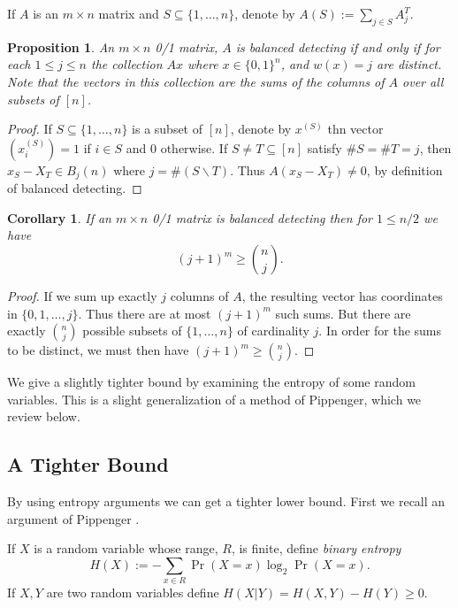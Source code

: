 \documentclass{article}
\newtheorem{proposition}{Proposition}
\newtheorem{corollary}{Corollary}
\begin{document}
If $A$ is an $m \times n$ matrix and $S \subseteq \{1, \dots, n\}$,
denote by $A(S) := \sum_{j \in S} A^T_j$.
\begin{proposition}
  An $m\times n$ 0/1 matrix, $A$ is balanced detecting if and only if
  for each $1 \le j \le n$ the
  collection $A x$ where $x\in \{0,1\}^n$, and $w(x) = j$ are
  distinct.  Note that the vectors in this collection are the sums of
  the columns of $A$ over all subsets of $[n]$.
\end{proposition}
\begin{proof}
  If $S \subseteq \{1, \dots, n\}$ is a subset of $[n]$, denote by
  $x^{(S)}$  thn vector $(x^{(S)}_i) = 1$ if $i \in S$ and 0
  otherwise.  If $S \ne T \subseteq [n]$ satisfy $\#S = \#T = j$, then
  $x_S - X_T \in B_j(n)$ where $j = \# (S \backslash T)$.  Thus
  $A(x_S - X_T) \ne 0$, by definition of balanced detecting.
\end{proof}
\begin{corollary}
  If an $m \times n$ 0/1 matrix is balanced detecting then for $1 \le
  n/2$ we have
  \begin{displaymath}
    (j+1)^m \ge \binom{n}{j}.
  \end{displaymath}
\end{corollary}
\begin{proof}
  If we sum up exactly $j$ columns of $A$, the resulting vector has
  coordinates in $\{0,1, \dots, j\}$.  Thus there are at most
  $(j+1)^m$ such sums.  But there are exactly $\binom{n}{j}$ possible
  subsets of $\{1, \dots, n\}$ of cardinality $j$.  In order for the
  sums to be distinct, we must then have $(j+1)^m \ge \binom{n}{j}$.
\end{proof}
We give a slightly tighter bound by examining the entropy of
some random variables.  This is a slight generalization of a method of
Pippenger, which we review below.

\subsection{A Tighter Bound}
\label{sec:tighter}

By using entropy arguments we can get a tighter lower bound.  First we
recall an argument of Pippenger \cite{pippenger1977information}.

If $X$ is a random variable whose range, $R$, is finite, define
\emph{binary entropy}
\begin{displaymath}
  H(X) := - \sum_{x \in R} \Pr(X = x) \log_2 \Pr(X = x).
\end{displaymath}
If $X,Y$ are two random variables define $H(X | Y) = H(X, Y) - H(Y)
\ge 0$.
\end{document}
